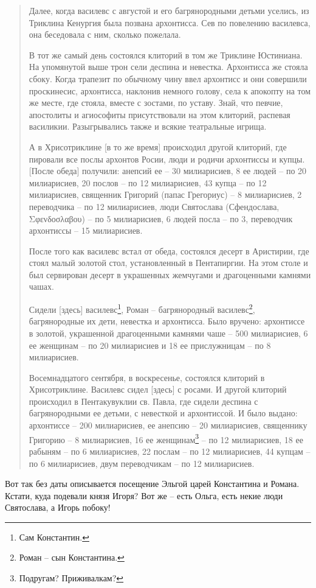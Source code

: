 \begin{quotation}
Далее, когда василевс с августой и его багрянородными детьми уселись, из Триклина Кенургия была позвана архонтисса. Сев по повелению василевса, она беседовала с ним, сколько пожелала.

В тот же самый день состоялся клиторий в том же Триклине Юстиниана. На упомянутой выше трон сели деспина и невестка. Архонтисса же стояла сбоку. Когда трапезит по обычному чину ввел архонтисс и они совершили проскинесис, архонтисса, наклонив немного голову, села к апокопту на том же месте, где стояла, вместе с зостами, по уставу. Знай, что певчие, апостолиты и агиософиты присутствовали на этом клиторий, распевая василикии. Разыгрывались также и всякие театральные игрища.

А в Хрисотриклине [в то же время] происходил другой клиторий, где пировали все послы архонтов Росии, люди и родичи архонтиссы и купцы. [После обеда] получили: анепсий ее – 30 милиарисиев, 8 ее людей – по 20 милиарисиев, 20 послов – по 12 милиарисиев, 43 купца – по 12 милиарисиев, священник Григорий (папас Грегориус) – 8 милиарисиев, 2 переводчика – по 12 милиарисиев, люди Святослава (Сфендослава, Σφενδοσλαβου) – по 5 милиарисиев, 6 людей посла – по 3, переводчик архонтиссы – 15 милиарисиев.

После того как василевс встал от обеда, состоялся десерт в Аристирии, где стоял малый золотой стол, установленный в Пентапиргии. На этом столе и был сервирован десерт в украшенных жемчугами и драгоценными камнями чашах.

Сидели [здесь] василевс\footnote{Сам Константин.}, Роман – багрянородный василевс\footnote{Роман – сын Константина.}, багрянородные их дети, невестка и архонтисса. Было вручено: архонтиссе в золотой, украшенной драгоценными камнями чаше – 500 милиарисиев, 6 ее женщинам – по 20 милиарисиев и 18 ее прислужницам – по 8 милиарисиев.

Восемнадцатого сентября, в воскресенье, состоялся клиторий в Хрисотриклине. Василевс сидел [здесь] с росами. И другой клиторий происходил в Пентакувуклии св. Павла, где сидели деспина с багрянородными ее детьми, с невесткой и архонтиссой. И было выдано: архонтиссе – 200 милиарисиев, ее анепсию – 20 милиарисиев, священнику Григорию – 8 милиарисиев, 16 ее женщинам\footnote{Подругам? Приживалкам?} – по 12 милиарисиев, 18 ее рабыням – по 6 милиарисиев, 22 послам – по 12 милиарисиев, 44 купцам – по 6 милиарисиев, двум переводчикам – по 12 милиарисиев.
\end{quotation}

Вот так без даты описывается посещение Эльгой царей Константина и Романа. Кстати, куда подевали князя Игоря? Вот же – есть Ольга, есть некие люди Святослава, а Игорь побоку!

